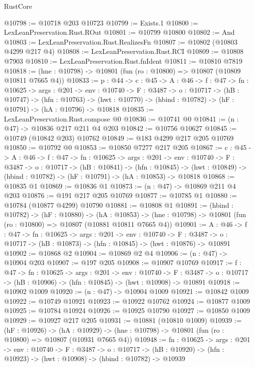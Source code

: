 \begin{lexlean}{RustCore}
\begin{coremodule}
@10798 := @10718 @203 @10723
@10799 := Exists.{1}
@10800 := LexLeanPreservation.Rust.ROut
@10801 := @10799 @10800
@10802 := And
@10803 := LexLeanPreservation.Rust.RealizesFn
@10807 := @10802 (@10803 @4299 @217 @4)
@10808 := LexLeanPreservation.Rust.RCI
@10809 := @10808 @7903
@10810 := LexLeanPreservation.Rust.fnIdent
@10811 := @10810 @7819
@10818 := (hne : @10798) -> @10801 (fun (ro : @10800) => @10807 (@10809 @10811 @7665 @4))
@10833 := {p : @44} ->
  {c : @45} ->
  {A : @46} ->
  {f : @47} ->
  {fn : @10625} ->
  {args : @201} ->
  {env : @10740} ->
  {F : @3487} ->
  {o : @10717} ->
  (hB : @10747) ->
  (hfn : @10763) -> (hwt : @10770) -> (hbind : @10782) -> (hF : @10791) -> (hA : @10796) -> @10818
@10835 := LexLeanPreservation.Rust.compose @0
@10836 := @10741 @0
@10841 := (n : @47) -> @10836 @217 @211 @4 @203
@10842 := @10756 @10627
@10845 := @10749 (@10842 @203) @10762
@10849 := @183 @4299 @217 @205 @10769
@10850 := @10792 @0
@10853 := @10850 @7277 @217 @205
@10867 := {c : @45} ->
  {A : @46} ->
  {f : @47} ->
  {fn : @10625} ->
  {args : @201} ->
  {env : @10740} ->
  {F : @3487} ->
  {o : @10717} ->
  (hB : @10841) ->
  (hfn : @10845) -> (hwt : @10849) -> (hbind : @10782) -> (hF : @10791) -> (hA : @10853) -> @10818
@10868 := @10835 @1
@10869 := @10836 @1
@10873 := (n : @47) -> @10869 @211 @4 @203
@10876 := @191 @217 @205 @10769
@10877 := @10785 @1
@10880 := @10784 (@10877 @4299) @10790
@10881 := @10808 @1
@10891 := (hbind : @10782) ->
  (hF : @10880) ->
  (hA : @10853) -> (hne : @10798) -> @10801 (fun (ro : @10800) => @10807 (@10881 @10811 @7665 @4))
@10901 := {A : @46} ->
  {f : @47} ->
  {fn : @10625} ->
  {args : @201} ->
  {env : @10740} ->
  {F : @3487} -> {o : @10717} -> (hB : @10873) -> (hfn : @10845) -> (hwt : @10876) -> @10891
@10902 := @10868 @2
@10904 := @10869 @2 @4
@10906 := (n : @47) -> @10904 @203
@10907 := @197 @205
@10908 := @10907 @10769
@10917 := {f : @47} ->
  {fn : @10625} ->
  {args : @201} ->
  {env : @10740} ->
  {F : @3487} -> {o : @10717} -> (hB : @10906) -> (hfn : @10845) -> (hwt : @10908) -> @10891
@10918 := @10902 @1009
@10920 := (n : @47) -> @10904 @1009
@10921 := @10842 @1009
@10922 := @10749 @10921
@10923 := @10922 @10762
@10924 := @10877 @1009
@10925 := @10784 @10924
@10926 := @10925 @10790
@10927 := @10850 @1009
@10929 := @10927 @217 @205
@10931 := @10881 (@10810 @1009)
@10939 := (hF : @10926) ->
  (hA : @10929) -> (hne : @10798) -> @10801 (fun (ro : @10800) => @10807 (@10931 @7665 @4))
@10948 := {fn : @10625} ->
  {args : @201} ->
  {env : @10740} ->
  {F : @3487} ->
  {o : @10717} -> (hB : @10920) -> (hfn : @10923) -> (hwt : @10908) -> (hbind : @10782) -> @10939

\end{coremodule}
\end{lexlean}
